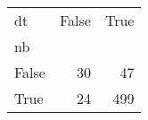 \begin{tabular}{lrr}
\toprule
dt &  False &  True  \\
nb    &        &        \\
\midrule
False &     30 &     47 \\
True  &     24 &    499 \\
\bottomrule
\end{tabular}
